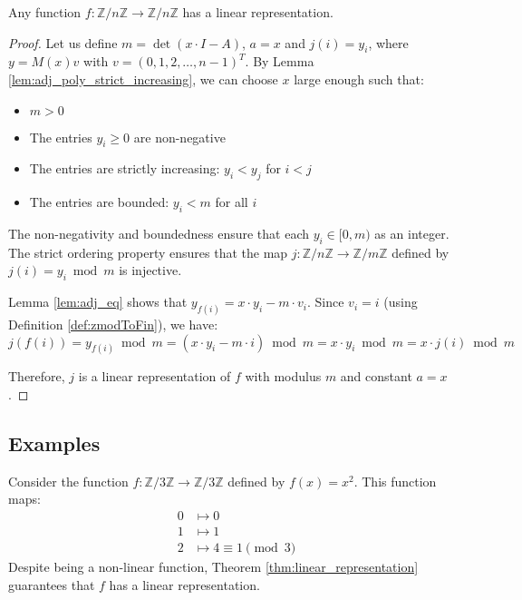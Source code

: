 \begin{theorem}
\label{thm:linear_representation}
\leanok
{}
Any function $f: \mathbb{Z}/n\mathbb{Z} \to \mathbb{Z}/n\mathbb{Z}$ has a linear representation.
\end{theorem}

\begin{proof}
Let us define $m = \det(x\cdot I - A)$, $a = x$ and $j(i) = y_i$, where $y = M(x)v$ with $v = (0,1,2,\ldots,n-1)^T$. 
By Lemma \ref{lem:adj_poly_strict_increasing}, we can choose $x$ large enough such that:
\begin{itemize}
\item $m > 0$
\item The entries $y_i \geq 0$ are non-negative
\item The entries are strictly increasing: $y_i < y_j$ for $i < j$
\item The entries are bounded: $y_i < m$ for all $i$
\end{itemize}

The non-negativity and boundedness ensure that each $y_i \in [0, m)$ as an integer.
The strict ordering property ensures that the map $j: \mathbb{Z}/n\mathbb{Z} \to \mathbb{Z}/m\mathbb{Z}$ defined by $j(i) = y_i \bmod m$ is injective.

Lemma \ref{lem:adj_eq} shows that $y_{f(i)} = x\cdot y_i - m\cdot v_i$.
Since $v_i = i$ (using Definition \ref{def:zmodToFin}), we have:
$$j(f(i)) = y_{f(i)} \bmod m = (x\cdot y_i - m\cdot i) \bmod m = x\cdot y_i \bmod m = x\cdot j(i) \bmod m$$

Therefore, $j$ is a linear representation of $f$ with modulus $m$ and constant $a = x$.
\end{proof}

\subsection*{Examples}

\begin{example}
\label{ex:quadratic_Z3}
Consider the function $f: \mathbb{Z}/3\mathbb{Z} \to \mathbb{Z}/3\mathbb{Z}$ defined by $f(x) = x^2$.
This function maps:
\begin{align*}
0 &\mapsto 0 \\
1 &\mapsto 1 \\
2 &\mapsto 4 \equiv 1 \pmod{3}
\end{align*}
Despite being a non-linear function, Theorem \ref{thm:linear_representation} guarantees that $f$ has a linear representation.
\end{example}


